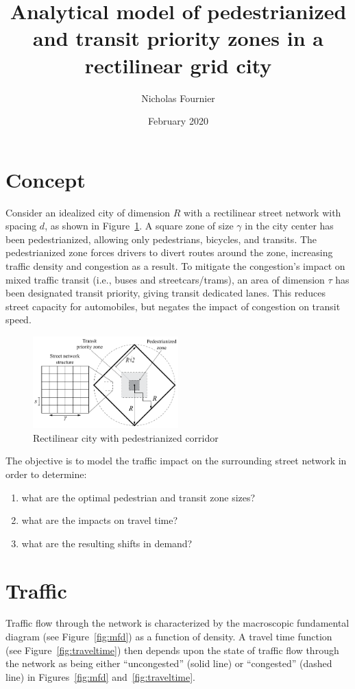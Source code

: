 \documentclass{article}
\title{Analytical model of pedestrianized and transit priority zones in a rectilinear grid city}
\author{Nicholas Fournier}
\date{February 2020}
\begin{document}
\maketitle

\section{Concept}
Consider an idealized city of dimension $R$ with a rectilinear street network with spacing $d$, as shown in Figure~\ref{fig:gridcity}. A square zone of size $\gamma$ in the city center has been pedestrianized, allowing only pedestrians, bicycles, and transits. The pedestrianized zone forces drivers to divert routes around the zone, increasing traffic density and congestion as a result. To mitigate the congestion's impact on mixed traffic transit (i.e., buses and streetcars/trams), an area of dimension $\tau$ has been designated transit priority, giving transit dedicated lanes. This reduces street capacity for automobiles, but negates the impact of congestion on transit speed.

\begin{figure}[!ht]
     \centering
     \includegraphics[width=0.5\textwidth]{diagram_pedtransit_grid_city}
     \caption{Rectilinear city with pedestrianized corridor}
     \label{fig:gridcity}
\end{figure}

\noindent The objective is to model the traffic impact on the surrounding street network in order to determine:
\begin{enumerate}[topsep=3pt, itemsep=3pt, partopsep=3pt, parsep=3pt]
    \itshape
    \item what are the optimal pedestrian and transit zone sizes?
    \item what are the impacts on travel time?
    \item what are the resulting shifts in demand?
\end{enumerate}

\section{Traffic}
Traffic flow through the network is characterized by the macroscopic fundamental diagram (see Figure~\ref{fig:mfd}) as a function of density. A travel time function (see Figure~\ref{fig:traveltime}) then depends upon the state of traffic flow through the network as being either ``uncongested'' (solid line) or ``congested'' (dashed line) in Figures~\ref{fig:mfd} and~\ref{fig:traveltime}.
\end{document}
